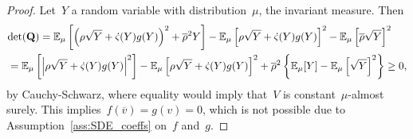\begin{proof}
Let~$Y$ a random variable with distribution~$\mu$, the invariant measure. Then 
\begin{align*}
& \mathrm{det}(\boldsymbol{\mathrm{Q}}) = \mathbb{E}_\mu\left[ \left( \rho\sqrt{Y} + \dot{\varsigma}(Y)g(Y)\right)^2 +\overline{\rho}^2 Y \right ]
- \mathbb{E}_\mu\left[ \rho\sqrt{Y} + \dot{\varsigma}(Y)g(Y) \right ]^2
- \mathbb{E}_\mu\left[ \overline{\rho} \sqrt{Y} \right ]^2 \\
&= \mathbb{E}_\mu\left[ \left| \rho\sqrt{Y} + \dot{\varsigma}(Y)g(Y)\right|^2 \right ] - \mathbb{E}_\mu\left[ \rho\sqrt{Y} + \dot{\varsigma}(Y)g(Y) \right ]^2 + \overline{\rho}^2
\left\{\mathbb{E}_\mu[Y]
- \mathbb{E}_\mu\left[\sqrt{Y}\right ]^2\right\}
\geq 0,
\end{align*}
by Cauchy-Schwarz, where equality would imply that~$V$ is constant~$\mu$-almost surely. This implies~$f(\overline{v})=g(v)=0$, which is not possible due to Assumption~\ref{ass:SDE_coeffs} on~$f$ and~$g$. 
\end{proof}

